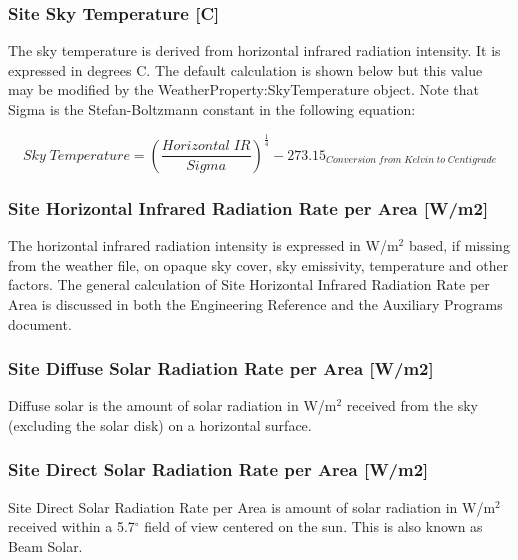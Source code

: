 \subsubsection{Site Sky Temperature {[}C{]}}\label{site-sky-temperature-c}

The sky temperature is derived from horizontal infrared radiation intensity. It is expressed in degrees C. The default calculation is shown below but this value may be modified by the WeatherProperty:SkyTemperature object. Note that Sigma is the Stefan-Boltzmann constant in the following equation:

\begin{equation}
Sky\;Temperature = {\left( {\frac{{Horizontal\;IR}}{{Sigma}}} \right)^{\frac{1}{4}}} - {273.15_{Conversion\;from\;Kelvin\;to\;Centigrade}}
\end{equation}

\subsubsection{Site Horizontal Infrared Radiation Rate per Area {[}W/m2{]}}\label{site-horizontal-infrared-radiation-rate-per-area-wm2}

The horizontal infrared radiation intensity is expressed in W/m$^2$ based, if missing from the weather file, on opaque sky cover, sky emissivity, temperature and other factors. The general calculation of Site Horizontal Infrared Radiation Rate per Area is discussed in both the Engineering Reference and the Auxiliary Programs document.

\subsubsection{Site Diffuse Solar Radiation Rate per Area {[}W/m2{]}}\label{site-diffuse-solar-radiation-rate-per-area-wm2}

Diffuse solar is the amount of solar radiation in W/m$^2$ received from the sky (excluding the solar disk) on a horizontal surface.

\subsubsection{Site Direct Solar Radiation Rate per Area {[}W/m2{]}}\label{site-direct-solar-radiation-rate-per-area-wm2}

Site Direct Solar Radiation Rate per Area is amount of solar radiation in W/m$^2$ received within a 5.7$^\circ$ field of view centered on the sun. This is also known as Beam Solar.

